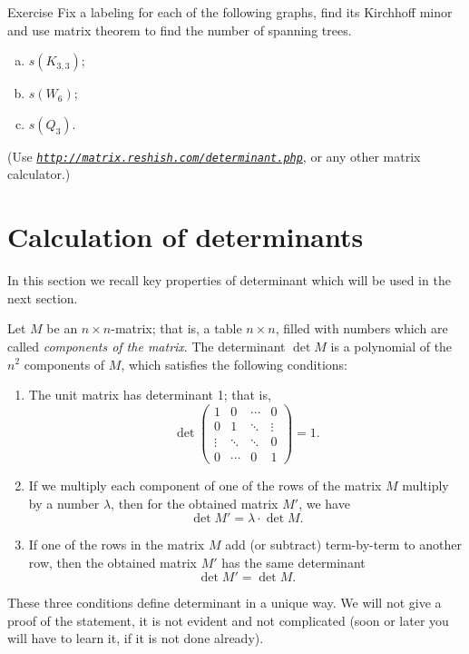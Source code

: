 \begin{thm}{Exercise}
Fix a labeling for each of the following graphs, 
find its Kirchhoff minor and use matrix theorem to find the number of spanning trees.
\begin{enumerate}[(a)]
\item $s(K_{3,3})$;
\item $s(W_6)$;
\item $s(Q_3)$.
\end{enumerate}
(Use \href{http://matrix.reshish.com/determinant.php}{\emph{\texttt{http://matrix.reshish.com/determinant.php}}}, or any other matrix calculator.)
\end{thm}


\section*{Calculation of determinants}

In this section we recall key properties of determinant which will be used in the next section.

Let $M$ be an $n{\times}n$-matrix; that is, a table $n{\times}n$, filled with numbers which are called {}\emph{components of the matrix}.
The determinant $\det M$ is a polynomial of the $n^2$ components of $M$,
which satisfies the following conditions:
\begin{enumerate}
 \item\label{1} The unit matrix has determinant 1; that is,
\[
\det\left(
\begin{matrix}
1&0&\cdots&0
\\
0&1&\ddots&\vdots
\\
\vdots&\ddots&\ddots&0
\\
0&\cdots&0&1
\end{matrix}
\right)=1.
\]
\item\label{2} If we multiply each component of one of the rows of the matrix $M$ multiply by a number $\lambda$, then for the obtained matrix $M'$, we have
\[\det M'=\lambda\cdot \det M.\]

\item\label{3} If one of the rows in the matrix $M$ add (or subtract) term-by-term to another row, then the obtained matrix $M'$ has the same determinant
\[\det M'= \det M.\]
\end{enumerate}
These three conditions define determinant in a unique way. 
We will not give a proof of the statement, it is not evident and not complicated (soon or later you will have to learn it, if it is not done already).

